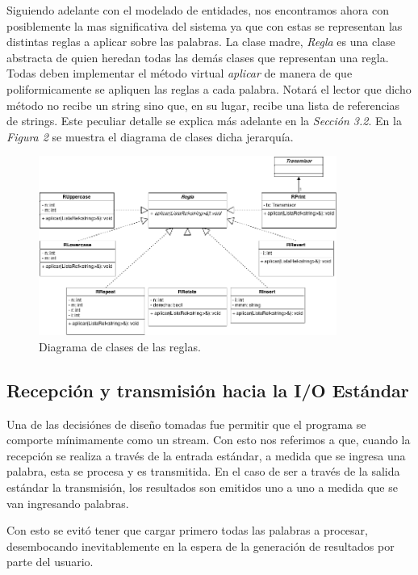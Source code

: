 \documentclass{article}
\begin{document}
	Siguiendo adelante con el modelado de entidades, nos encontramos ahora con posiblemente la mas significativa del sistema ya que con estas se representan las distintas reglas a aplicar sobre las palabras. La clase madre, \textit{Regla} es una clase abstracta de quien heredan todas las demás clases que representan una regla. Todas deben implementar el método virtual \textit{aplicar} de manera de que poliformicamente se apliquen las reglas a cada palabra. Notará el lector que dicho método no recibe un string sino que, en su lugar, recibe una lista de referencias de strings. Este peculiar detalle se explica más adelante en la \textit{Sección 3.2}. En la \textit{Figura 2} se muestra el diagrama de clases dicha jerarquía.
\bigskip


\begin{figure}[h]
	\centering
	\includegraphics[width=0.87\textwidth]{images/diagrama_3.png}
	\medskip
	\caption{Diagrama de clases de las reglas.}
\end{figure}
\bigskip


\subsection{Recepción y transmisión hacia la I/O Estándar}

	Una de las decisiónes de diseño tomadas fue permitir que el programa se comporte mínimamente como un stream. Con esto nos referimos a que, cuando la recepción se realiza a través de la entrada estándar, a medida que se ingresa una palabra, esta se procesa y es transmitida. En el caso de ser a través de la salida estándar la transmisión, los resultados son emitidos uno a uno a medida que se van ingresando palabras.
	\par
	Con esto se evitó tener que cargar primero todas las palabras a procesar, desembocando inevitablemente en la espera de la generación de resultados por parte del usuario.
\bigskip\medskip
\end{document}
